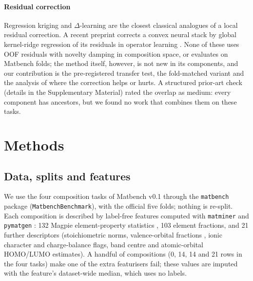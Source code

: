 \paragraph{Residual correction}
Regression kriging \citep{hengl2007rk} and $\Delta$-learning \citep{ramakrishnan2015delta} are the closest classical analogues of a local residual correction.
A recent preprint corrects a convex neural stack by global kernel-ridge regression of its residuals in operator learning \citep{shmalo2026kernel}.
None of these uses OOF residuals with novelty damping in composition space, or evaluates on Matbench folds; the method itself, however, is not new in its components, and our contribution is the pre-registered transfer test, the fold-matched variant and the analysis of where the correction helps or hurts.
A structured prior-art check (details in the Supplementary Material) rated the overlap as medium: every component has ancestors, but we found no work that combines them on these tasks.

\section{Methods}
\label{sec:methods}

\subsection{Data, splits and features}
We use the four composition tasks of Matbench v0.1 through the \texttt{matbench} package (\texttt{MatbenchBenchmark}), with the official five folds; nothing is re-split.
Each composition is described by label-free features computed with \texttt{matminer} \citep{ward2018matminer} and \texttt{pymatgen} \citep{ong2013pymatgen}: 132 Magpie element-property statistics \citep{ward2016magpie}, 103 element fractions, and 21 further descriptors (stoichiometric norms, valence-orbital fractions \citep{meredig2014}, ionic character and charge-balance flags, band centre and atomic-orbital HOMO/LUMO estimates).
A handful of compositions (0, 14, 14 and 21 rows in the four tasks) make one of the extra featurisers fail; these values are imputed with the feature's dataset-wide median, which uses no labels.

